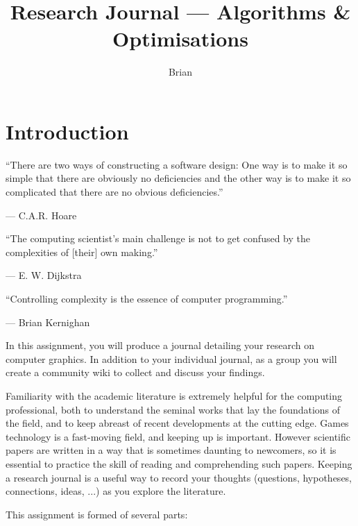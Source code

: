 \documentclass{../../fal_assignment}
\title{Research Journal --- Algorithms \& Optimisations}
\author{Brian}
\begin{document}
\maketitle

\section*{Introduction}

\begin{marginquote}
  ``There are two ways of constructing a software design: One way is to make it so simple that there are obviously no deficiencies and the other way is to make it so complicated that there are no obvious deficiencies.''
    
    --- C.A.R. Hoare
    
    \marginquoterule
    
    ``The computing scientist's main challenge is not to get confused by the complexities of [their] own making.''
    
    --- E. W. Dijkstra
    
    \marginquoterule

        ``Controlling complexity is the essence of computer programming.''
    
    --- Brian Kernighan
            
\end{marginquote}

In this assignment, you will produce a journal detailing your research on computer graphics. In addition to your individual journal, as a group you will create a community wiki to collect and discuss your findings.

Familiarity with the academic literature is extremely helpful for the computing professional,
both to understand the seminal works that lay the foundations of the field,
and to keep abreast of recent developments at the cutting edge.
Games technology is a fast-moving field, and keeping up is important.
However scientific papers are written in a way that is sometimes daunting to newcomers,
so it is essential to practice the skill of reading and comprehending such papers.
Keeping a research journal is a useful way to record your thoughts
(questions, hypotheses, connections, ideas, ...) as you explore the literature.

This assignment is formed of several parts:
\end{document}
